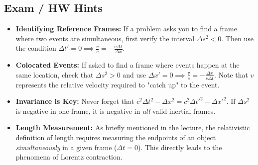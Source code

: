 \subsection*{Exam / HW Hints}
\begin{itemize}
    \item \textbf{Identifying Reference Frames:} If a problem asks you to find a frame where two events are simultaneous, first verify the interval $\Delta s^2 < 0$. Then use the condition $\Delta t' = 0 \implies \frac{v}{c} = -\frac{c\Delta t}{\Delta x}$. 
    \item \textbf{Colocated Events:} If asked to find a frame where events happen at the same location, check that $\Delta s^2 > 0$ and use $\Delta x' = 0 \implies \frac{v}{c} = -\frac{\Delta x}{c\Delta t}$. Note that $v$ represents the relative velocity required to "catch up" to the event.
    \item \textbf{Invariance is Key:} Never forget that $c^2 \Delta t^2 - \Delta x^2 = c^2 \Delta t'^2 - \Delta x'^2$. If $\Delta s^2$ is negative in one frame, it is negative in \textit{all} valid inertial frames.
    \item \textbf{Length Measurement:} As briefly mentioned in the lecture, the relativistic definition of length requires measuring the endpoints of an object \textit{simultaneously} in a given frame ($\Delta t = 0$). This directly leads to the phenomena of Lorentz contraction.
\end{itemize}

